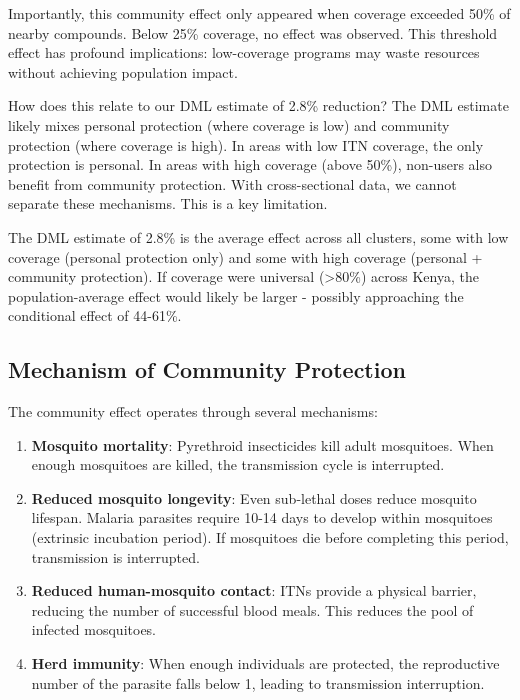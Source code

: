 Importantly, this community effect only appeared when coverage exceeded 50\% of nearby compounds. Below 25\% coverage, no effect was observed. This threshold effect has profound implications: low-coverage programs may waste resources without achieving population impact.

How does this relate to our DML estimate of 2.8\% reduction? The DML estimate likely mixes personal protection (where coverage is low) and community protection (where coverage is high). In areas with low ITN coverage, the only protection is personal. In areas with high coverage (above 50\%), non-users also benefit from community protection. With cross-sectional data, we cannot separate these mechanisms. This is a key limitation.

The DML estimate of 2.8\% is the average effect across all clusters, some with low coverage (personal protection only) and some with high coverage (personal + community protection). If coverage were universal (>80\%) across Kenya, the population-average effect would likely be larger - possibly approaching the conditional effect of 44-61\%.

\subsection{Mechanism of Community Protection}

The community effect operates through several mechanisms:

\begin{enumerate}
	\item \textbf{Mosquito mortality}: Pyrethroid insecticides kill adult mosquitoes. When enough mosquitoes are killed, the transmission cycle is interrupted.
	
	\item \textbf{Reduced mosquito longevity}: Even sub-lethal doses reduce mosquito lifespan. Malaria parasites require 10-14 days to develop within mosquitoes (extrinsic incubation period). If mosquitoes die before completing this period, transmission is interrupted.
	
	\item \textbf{Reduced human-mosquito contact}: ITNs provide a physical barrier, reducing the number of successful blood meals. This reduces the pool of infected mosquitoes.
	
	\item \textbf{Herd immunity}: When enough individuals are protected, the reproductive number of the parasite falls below 1, leading to transmission interruption.
\end{enumerate}

